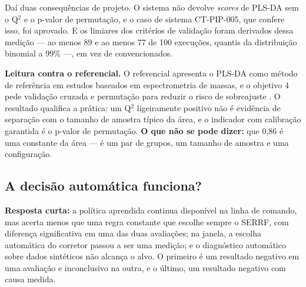 Daí duas consequências de projeto. O sistema não devolve \textit{scores} de PLS-DA sem o Q$^{2}$ e o p-valor de permutação, e o caso de sistema CT-PIP-005, que confere isso, foi aprovado. E os limiares dos critérios de validação foram derivados dessa medição --- ao menos 89 e ao menos 77 de 100 execuções, quantis da distribuição binomial a 99\% ---, em vez de convencionados.


\textbf{Leitura contra o referencial.} O referencial apresenta o PLS-DA como método de referência em estudos baseados em espectrometria de massas, e o objetivo 4 pede validação cruzada e permutação para reduzir o risco de sobreajuste \cite{worley2013multivariate}. O resultado qualifica a prática: um Q$^{2}$ ligeiramente positivo não é evidência de separação com o tamanho de amostra típico da área, e o indicador com calibração garantida é o p-valor de permutação. \textbf{O que não se pode dizer:} que 0,86 é uma constante da área --- é um par de grupos, um tamanho de amostra e uma configuração.

\subsection{A decisão automática funciona?}\label{sec:5-3-4}

\textbf{Resposta curta:} a política aprendida continua disponível na linha de comando, mas acerta menos que uma regra constante que escolhe sempre o SERRF, com diferença significativa em uma das duas avaliações; na janela, a escolha automática do corretor passou a ser uma medição; e o diagnóstico automático sobre dados sintéticos não alcança o alvo. O primeiro é um resultado negativo em uma avaliação e inconclusivo na outra, e o último, um resultado negativo com causa medida.

